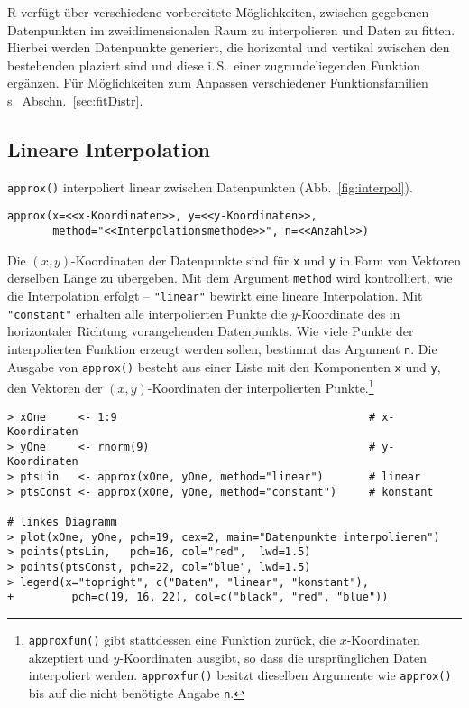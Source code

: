 R verfügt über verschiedene vorbereitete Möglichkeiten, zwischen gegebenen Datenpunkten im zweidimensionalen Raum zu interpolieren und Daten zu fitten. Hierbei werden Datenpunkte generiert, die horizontal und vertikal zwischen den bestehenden plaziert sind und diese i.\,S.\ einer zugrundeliegenden Funktion ergänzen. Für Möglichkeiten zum Anpassen verschiedener Funktionsfamilien s.\ Abschn.\ \ref{sec:fitDistr}.

\subsection{Lineare Interpolation}
\label{sec:linearInter}

\lstinline!approx()! interpoliert linear zwischen Datenpunkten (Abb.\ \ref{fig:interpol}).
\begin{lstlisting}
approx(x=<<x-Koordinaten>>, y=<<y-Koordinaten>>,
       method="<<Interpolationsmethode>>", n=<<Anzahl>>)
\end{lstlisting}

Die $(x, y)$-Koordinaten der Datenpunkte sind für \lstinline!x! und \lstinline!y! in Form von Vektoren derselben Länge zu übergeben. Mit dem Argument \lstinline!method! wird kontrolliert, wie die Interpolation erfolgt -- \lstinline!"linear"! bewirkt eine lineare Interpolation. Mit \lstinline!"constant"! erhalten alle interpolierten Punkte die $y$-Koordinate des in horizontaler Richtung vorangehenden Datenpunkts. Wie viele Punkte der interpolierten Funktion erzeugt werden sollen, bestimmt das Argument \lstinline!n!. Die Ausgabe von \lstinline!approx()! besteht aus einer Liste mit den Komponenten \lstinline!x! und \lstinline!y!, den Vektoren der $(x, y)$-Koordinaten der interpolierten Punkte.\footnote{\lstinline!approxfun()! gibt stattdessen eine Funktion zurück, die $x$-Koordinaten akzeptiert und $y$-Koordinaten ausgibt, so dass die ursprünglichen Daten interpoliert werden. \lstinline!approxfun()! besitzt dieselben Argumente wie \lstinline!approx()! bis auf die nicht benötigte Angabe \lstinline!n!.}
\begin{lstlisting}
> xOne     <- 1:9                                       # x-Koordinaten
> yOne     <- rnorm(9)                                  # y-Koordinaten
> ptsLin   <- approx(xOne, yOne, method="linear")       # linear
> ptsConst <- approx(xOne, yOne, method="constant")     # konstant

# linkes Diagramm
> plot(xOne, yOne, pch=19, cex=2, main="Datenpunkte interpolieren")
> points(ptsLin,   pch=16, col="red",  lwd=1.5)
> points(ptsConst, pch=22, col="blue", lwd=1.5)
> legend(x="topright", c("Daten", "linear", "konstant"),
+         pch=c(19, 16, 22), col=c("black", "red", "blue"))
\end{lstlisting}

